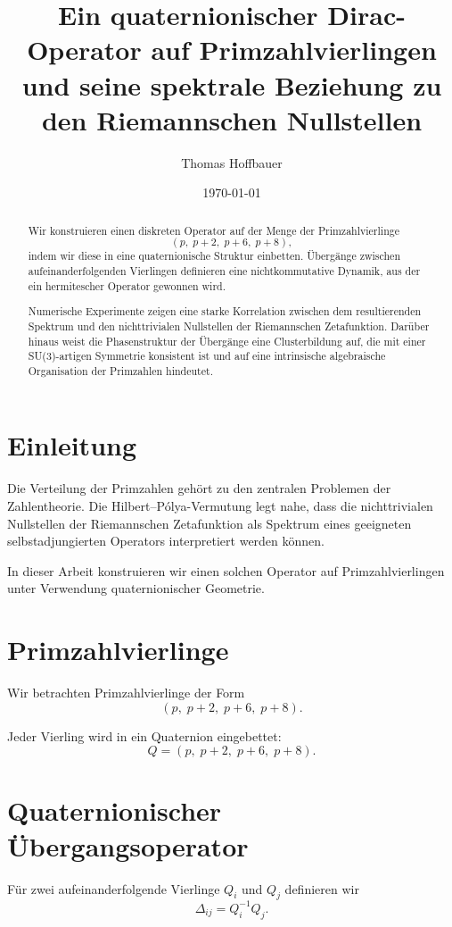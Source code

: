 \documentclass[11pt,a4paper]{article}
\title{Ein quaternionischer Dirac-Operator auf Primzahlvierlingen\\
	und seine spektrale Beziehung zu den Riemannschen Nullstellen}
\author{Thomas Hoffbauer}
\date{\today}
\begin{document}
	
	\maketitle
	
	\begin{abstract}
		Wir konstruieren einen diskreten Operator auf der Menge der Primzahlvierlinge
		\[
		(p,\; p+2,\; p+6,\; p+8),
		\]
		indem wir diese in eine quaternionische Struktur einbetten.
		Übergänge zwischen aufeinanderfolgenden Vierlingen definieren eine
		nichtkommutative Dynamik, aus der ein hermitescher Operator gewonnen wird.
		
		Numerische Experimente zeigen eine starke Korrelation zwischen dem resultierenden
		Spektrum und den nichttrivialen Nullstellen der Riemannschen Zetafunktion.
		Darüber hinaus weist die Phasenstruktur der Übergänge eine Clusterbildung auf,
		die mit einer SU(3)-artigen Symmetrie konsistent ist und auf eine intrinsische
		algebraische Organisation der Primzahlen hindeutet.
	\end{abstract}
	
	\section{Einleitung}
	
	Die Verteilung der Primzahlen gehört zu den zentralen Problemen der Zahlentheorie.
	Die Hilbert--Pólya-Vermutung legt nahe, dass die nichttrivialen Nullstellen der
	Riemannschen Zetafunktion als Spektrum eines geeigneten selbstadjungierten Operators
	interpretiert werden können.
	
	In dieser Arbeit konstruieren wir einen solchen Operator auf Primzahlvierlingen
	unter Verwendung quaternionischer Geometrie.
	
	\section{Primzahlvierlinge}
	
	Wir betrachten Primzahlvierlinge der Form
	\[
	(p,\; p+2,\; p+6,\; p+8).
	\]
	
	Jeder Vierling wird in ein Quaternion eingebettet:
	\[
	Q = (p,\; p+2,\; p+6,\; p+8).
	\]
	
	\section{Quaternionischer Übergangsoperator}
	
	Für zwei aufeinanderfolgende Vierlinge \(Q_i\) und \(Q_j\) definieren wir
	\[
	\Delta_{ij} = Q_i^{-1} Q_j.
	\]
	
\end{document}
